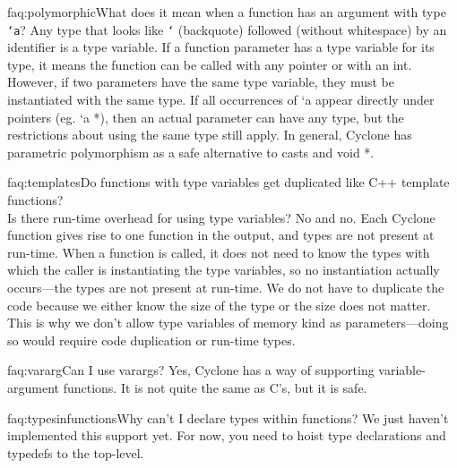 \begin{faqa}{faq:polymorphic}{What does it mean when a function has an argument with type \texttt{`a}?}
Any type that looks like \texttt{`} (backquote) followed (without
whitespace) by an identifier is a type variable.  If a function
parameter has a type variable for its type, it means the function can
be called with any pointer or with an int.  However, if two parameters
have the same type variable, they must be instantiated with the same
type. If all occurrences of `a appear directly under pointers (eg. `a
*), then an actual parameter can have any type, but the restrictions
about using the same type still apply.  In general, Cyclone has
parametric polymorphism as a safe alternative to casts and void *.
\end{faqa}

\begin{faqa}{faq:templates}{Do functions with type variables get duplicated like C++ template functions?\\  Is there run-time overhead for using type variables?}
No and no.  Each Cyclone function gives rise to one function in the
output, and types are not present at run-time.  When a function is
called, it does not need to know the types with which the caller is
instantiating the type variables, so no instantiation actually
occurs---the types are not present at run-time.  We do not have to
duplicate the code because we either know the size of the type or the
size does not matter.  This is why we don't allow type variables of
memory kind as parameters---doing so would require code duplication or
run-time types.
\end{faqa}

\begin{faqa}{faq:vararg}{Can I use varargs?}
Yes, Cyclone has a way of supporting variable-argument functions.  It
is not quite the same as C's, but it is safe.
\end{faqa}

\begin{faqa}{faq:typesinfunctions}{Why can't I declare types within functions?}
We just haven't implemented this support yet.  For now, you need to
hoist type declarations and typedefs to the top-level.
\end{faqa}

